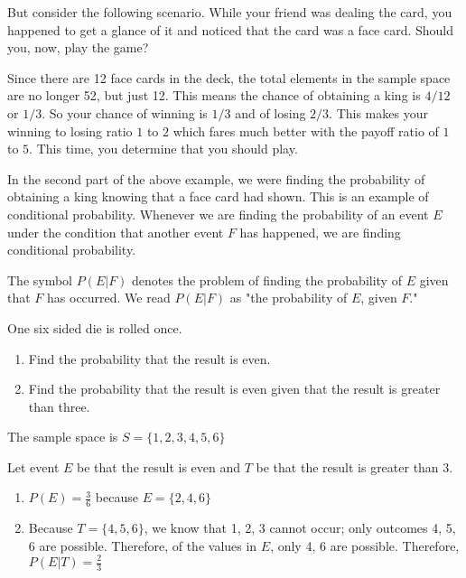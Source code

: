 But consider the following scenario. While your friend was dealing the card, you happened to get a glance of it and noticed that the card was a face card. Should you, now, play the game?

Since there are 12 face cards in the deck, the total elements in the sample space are no longer 52, but just 12. This means the chance of obtaining a king is $4/12$ or $1/3$. So your chance of winning is $1/3$ and of losing $2/3$. This makes your winning to losing ratio $1$ to $2$ which fares much better with the payoff ratio of $1$ to $5$. This time, you determine that you should play.

In the second part of the above example, we were finding the probability of obtaining a king knowing that a face card had shown. This is an example of conditional probability. Whenever we are finding the probability of an event $E$ under the condition that another event $F$ has happened, we are finding conditional probability.

The symbol $P(E | F)$ denotes the problem of finding the probability of $E$ given that $F$ has occurred. We read $P(E | F)$ as "the probability of $E$, given $F$."

\begin{example}
    One six sided die is rolled once.
    \begin{enumerate}
        \item Find the probability that the result is even.
        \item Find the probability that the result is even given that the result is greater than three.
    \end{enumerate}
\end{example}

\begin{solution}
    The sample space is \( S = \{1,2,3,4,5,6\} \)

    Let event \( E \) be that the result is even and \( T \) be that the result is greater than 3.
    \begin{enumerate}
        \item \( P(E) = \frac{3}{6} \) because \( E = \{2,4,6\} \)
        \item Because \( T = \{4,5,6\} \), we know that 1, 2, 3 cannot occur; only outcomes 4, 5, 6 are possible. Therefore, of the values in \( E \), only 4, 6 are possible. Therefore, \( P(E|T) = \frac{2}{3} \)
    \end{enumerate}
\end{solution}


